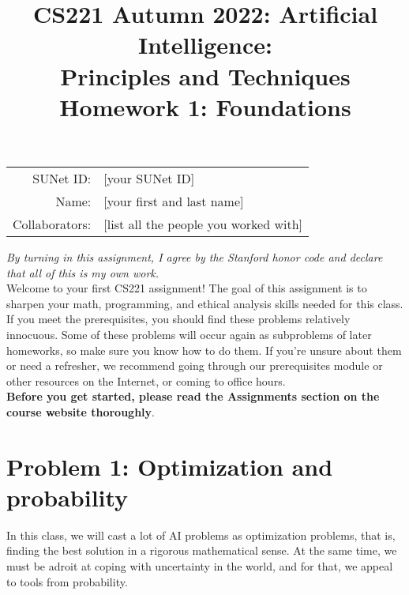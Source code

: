 \documentclass{article}
\title{\textbf{CS221 Autumn 2022: Artificial Intelligence:\\ Principles and Techniques} \\Homework 1: Foundations}
\date{}
\theoremstyle{case}
\theoremstyle{definition}
\begin{document}
\maketitle

\begin{center}
\begin{tabular}{rl}
SUNet ID: & [your SUNet ID] \\
Name: & [your first and last name] \\
Collaborators: & [list all the people you worked with]
\end{tabular}
\end{center}

\textit{By turning in this assignment, I agree by the Stanford honor code and declare
that all of this is my own work.} \\

Welcome to your first CS221 assignment! The goal of this assignment is to sharpen your math, programming, and ethical analysis skills needed for this class. If you meet the prerequisites, you should find these problems relatively innocuous. Some of these problems will occur again as subproblems of later homeworks, so make sure you know how to do them. If you're unsure about them or need a refresher, we recommend going through our prerequisites module or other resources on the Internet, or coming to office hours.\\

\textbf{Before you get started, please read the Assignments section on the course website thoroughly}.


\section*{Problem 1: Optimization and probability}

In this class, we will cast a lot of AI problems as optimization problems, that is, finding the best solution in a rigorous mathematical sense.
At the same time, we must be adroit at coping with uncertainty in the world, and for that, we appeal to tools from probability.
\end{document}
